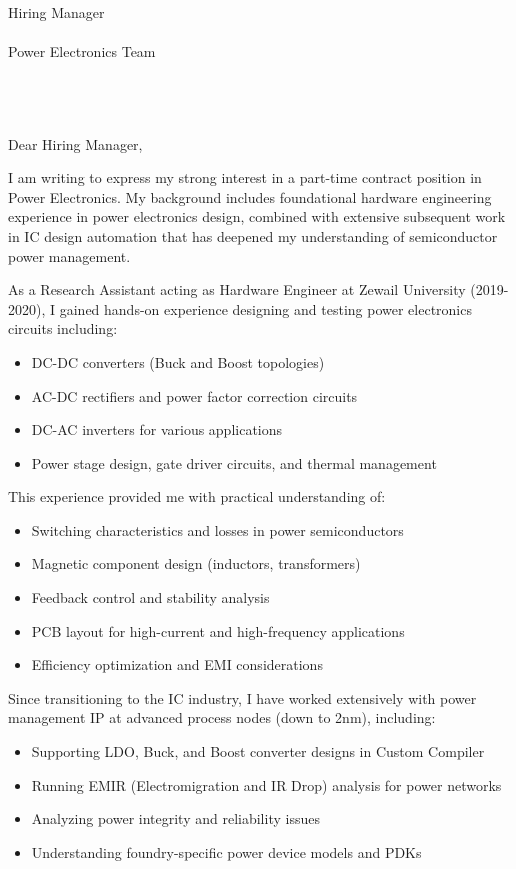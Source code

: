 \documentclass[11pt,a4paper]{letter}
\date{\today}
\begin{document}
\begin{letter}{
    Hiring Manager\\\\
    Power Electronics Team\\\\
    [Company Name]\\\\
    [Company Address]
}

\opening{Dear Hiring Manager,}

I am writing to express my strong interest in a part-time contract position in Power Electronics. My background includes foundational hardware engineering experience in power electronics design, combined with extensive subsequent work in IC design automation that has deepened my understanding of semiconductor power management.

As a Research Assistant acting as Hardware Engineer at Zewail University (2019-2020), I gained hands-on experience designing and testing power electronics circuits including:
\begin{itemize}
    \item DC-DC converters (Buck and Boost topologies)
    \item AC-DC rectifiers and power factor correction circuits
    \item DC-AC inverters for various applications
    \item Power stage design, gate driver circuits, and thermal management
\end{itemize}

This experience provided me with practical understanding of:
\begin{itemize}
    \item Switching characteristics and losses in power semiconductors
    \item Magnetic component design (inductors, transformers)
    \item Feedback control and stability analysis
    \item PCB layout for high-current and high-frequency applications
    \item Efficiency optimization and EMI considerations
\end{itemize}

Since transitioning to the IC industry, I have worked extensively with power management IP at advanced process nodes (down to 2nm), including:
\begin{itemize}
    \item Supporting LDO, Buck, and Boost converter designs in Custom Compiler
    \item Running EMIR (Electromigration and IR Drop) analysis for power networks
    \item Analyzing power integrity and reliability issues
    \item Understanding foundry-specific power device models and PDKs
\end{itemize}


\end{letter}
\end{document}
